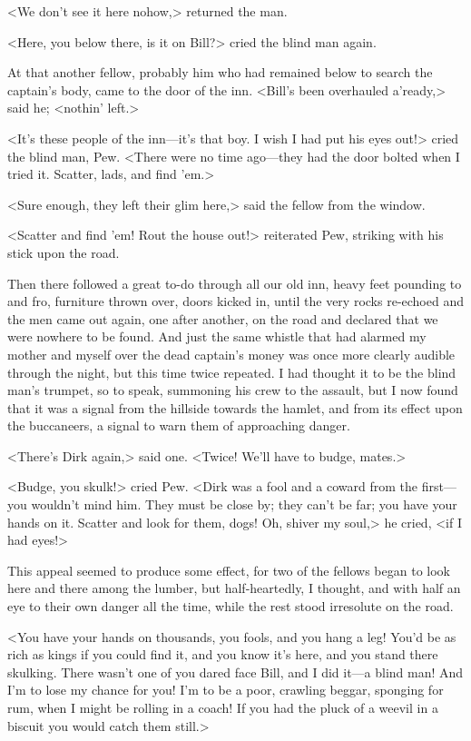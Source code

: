 <We don't see it here nohow,> returned the man.

<Here, you below there, is it on Bill?> cried the blind man again.

At that another fellow, probably him who had remained below to search the captain's body, came to the door of the inn. <Bill's been overhauled a'ready,> said he; <nothin' left.>

<It's these people of the inn—it's that boy. I wish I had put his eyes out!> cried the blind man, Pew. <There were no time ago—they had the door bolted when I tried it. Scatter, lads, and find 'em.>

<Sure enough, they left their glim here,> said the fellow from the window.

<Scatter and find 'em! Rout the house out!> reiterated Pew, striking with his stick upon the road.

Then there followed a great to-do through all our old inn, heavy feet pounding to and fro, furniture thrown over, doors kicked in, until the very rocks re-echoed and the men came out again, one after another, on the road and declared that we were nowhere to be found. And just the same whistle that had alarmed my mother and myself over the dead captain's money was once more clearly audible through the night, but this time twice repeated. I had thought it to be the blind man's trumpet, so to speak, summoning his crew to the assault, but I now found that it was a signal from the hillside towards the hamlet, and from its effect upon the buccaneers, a signal to warn them of approaching danger.

<There's Dirk again,> said one. <Twice! We'll have to budge, mates.>

<Budge, you skulk!> cried Pew. <Dirk was a fool and a coward from the first—you wouldn't mind him. They must be close by; they can't be far; you have your hands on it. Scatter and look for them, dogs! Oh, shiver my soul,> he cried, <if I had eyes!>

This appeal seemed to produce some effect, for two of the fellows began to look here and there among the lumber, but half-heartedly, I thought, and with half an eye to their own danger all the time, while the rest stood irresolute on the road.

<You have your hands on thousands, you fools, and you hang a leg! You'd be as rich as kings if you could find it, and you know it's here, and you stand there skulking. There wasn't one of you dared face Bill, and I did it—a blind man! And I'm to lose my chance for you! I'm to be a poor, crawling beggar, sponging for rum, when I might be rolling in a coach! If you had the pluck of a weevil in a biscuit you would catch them still.>

